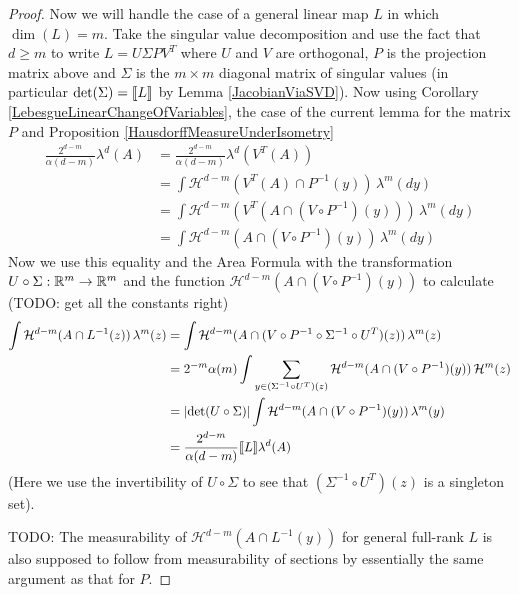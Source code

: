 \begin{proof}
Now we will handle the case of a general linear map $L$ in which $\dim(L)  = m$.  Take the singular value decomposition and use the fact that $d \geq m$ to write $L = U \Sigma P V^T$ where
$U$ and $V$ are orthogonal, $P$ is the projection matrix above and $\Sigma$ is the $m \times m$ diagonal matrix of singular values (in particular $\det(\Sigma) = \llbracket L \rrbracket$ by Lemma \ref{JacobianViaSVD}).  
Now using Corollary \ref{LebesgueLinearChangeOfVariables}, the case of the current lemma for the matrix $P$ and Proposition \ref{HausdorffMeasureUnderIsometry}
\begin{align*}
\frac{2^{d-m}} {\alpha(d-m)} \lambda^d(A) &= \frac{2^{d-m}} {\alpha(d-m)} \lambda^d( V^T (A)) \\
&= \int \mathcal{H}^{d-m}(V^T(A) \cap P^{-1}(y)) \, \lambda^m(dy) \\
&= \int \mathcal{H}^{d-m}(V^T(A \cap (V \circ P^{-1})(y))) \, \lambda^m(dy) \\
&= \int \mathcal{H}^{d-m}(A \cap (V \circ P^{-1})(y)) \, \lambda^m(dy) 
\end{align*}
Now we use this equality and the Area Formula with the transformation $U \circ \Sigma : \mathbb{R}^m \to \mathbb{R}^m$ and the function $\mathcal{H}^{d-m} (A \cap (V \circ P^{-1})(y))$ to calculate (TODO: get all the constants right)
\begin{align*}
\int \mathcal{H}^{d-m} (A \cap L^{-1}(z)) \, \lambda^m(z) &= \int \mathcal{H}^{d-m} (A \cap (V \circ P^{-1} \circ \Sigma^{-1} \circ U^T)(z)) \, \lambda^m(z) \\
&=2^{-m} \alpha(m) \int \sum_{y \in (\Sigma^{-1} \circ U^T)(z)} \mathcal{H}^{d-m} (A \cap (V \circ P^{-1})(y)) \, \mathcal{H}^m(z) \\
&= \left \vert \det(U \circ \Sigma) \right \vert \int \mathcal{H}^{d-m} (A \cap (V \circ P^{-1})(y)) \, \lambda^m(y) \\
&= \frac{2^{d-m}} {\alpha(d-m)} \llbracket L \rrbracket \lambda^d(A) 
\end{align*}
(Here we use the invertibility of $U \circ \Sigma$ to see that $(\Sigma^{-1} \circ U^T)(z)$ is a singleton set).

TODO: The measurability of $\mathcal{H}^{d-m}(A \cap L^{-1}(y))$ for general full-rank $L$ is also supposed to follow from measurability of sections by essentially the same argument as that for $P$.
\end{proof}

